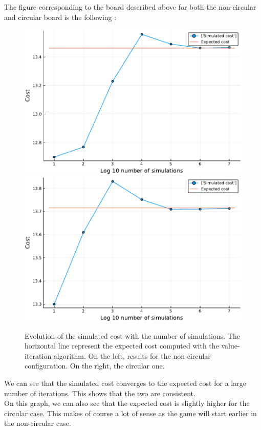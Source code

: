 The figure corresponding to the board described above for both the non-circular and circular board is the following :
\begin{figure}[H]
\centering
\includegraphics[scale=0.41]{../img/board_unif_low/cost_iterations_log_noncirc.pdf}
\includegraphics[scale=0.41]{../img/board_unif_low/cost_iterations_log_circ.pdf}
\caption{Evolution of the simulated cost with the number of simulations. The horizontal line represent the expected cost computed with the value-iteration algorithm. On the left, results for the non-circular configuration. On the right, the circular one.}
\label{fig:cost_iterations_log}
\end{figure}

We can see that the simulated cost converges to the expected cost for a large number of iterations.
This shows that the two are consistent. \\
On this graph, we can also see that the expected cost is slightly higher for the circular case. 
This makes of course a lot of sense as the game will start earlier in the non-circular case. 

